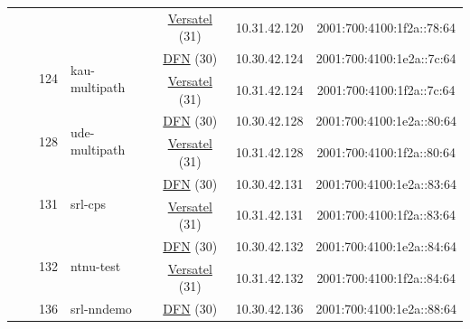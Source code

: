 \begin{small}
\begin{center}
\begin{longtable}{|c|c|c|c|c|c|c|c|}
  &  &  &  & \multicolumn{2}{|c|}{\tiny{\href{http://www.versatel.de}{Versatel} (31)}} & \tiny{10.31.42.120} & \tiny{2001:700:4100:1f2a::78:64} \\* \cline{3-3}\cline{4-4}\cline{5-5}\cline{6-6}\cline{7-7}\cline{8-8}
  &  & \multirow{2}{*}{\tiny{124}} & \multicolumn{1}{|l|}{\multirow{2}{*}{\tiny{kau-multipath}}} & \multicolumn{2}{|c|}{\tiny{\href{https://www.dfn.de}{DFN} (30)}} & \tiny{10.30.42.124} & \tiny{2001:700:4100:1e2a::7c:64} \\* \cline{5-5}\cline{6-6}\cline{7-7}\cline{8-8}
  &  &  &  & \multicolumn{2}{|c|}{\tiny{\href{http://www.versatel.de}{Versatel} (31)}} & \tiny{10.31.42.124} & \tiny{2001:700:4100:1f2a::7c:64} \\* \cline{3-3}\cline{4-4}\cline{5-5}\cline{6-6}\cline{7-7}\cline{8-8}
  &  & \multirow{2}{*}{\tiny{128}} & \multicolumn{1}{|l|}{\multirow{2}{*}{\tiny{ude-multipath}}} & \multicolumn{2}{|c|}{\tiny{\href{https://www.dfn.de}{DFN} (30)}} & \tiny{10.30.42.128} & \tiny{2001:700:4100:1e2a::80:64} \\* \cline{5-5}\cline{6-6}\cline{7-7}\cline{8-8}
  &  &  &  & \multicolumn{2}{|c|}{\tiny{\href{http://www.versatel.de}{Versatel} (31)}} & \tiny{10.31.42.128} & \tiny{2001:700:4100:1f2a::80:64} \\* \cline{3-3}\cline{4-4}\cline{5-5}\cline{6-6}\cline{7-7}\cline{8-8}
  &  & \multirow{2}{*}{\tiny{131}} & \multicolumn{1}{|l|}{\multirow{2}{*}{\tiny{srl-cps}}} & \multicolumn{2}{|c|}{\tiny{\href{https://www.dfn.de}{DFN} (30)}} & \tiny{10.30.42.131} & \tiny{2001:700:4100:1e2a::83:64} \\* \cline{5-5}\cline{6-6}\cline{7-7}\cline{8-8}
  &  &  &  & \multicolumn{2}{|c|}{\tiny{\href{http://www.versatel.de}{Versatel} (31)}} & \tiny{10.31.42.131} & \tiny{2001:700:4100:1f2a::83:64} \\* \cline{3-3}\cline{4-4}\cline{5-5}\cline{6-6}\cline{7-7}\cline{8-8}
  &  & \multirow{2}{*}{\tiny{132}} & \multicolumn{1}{|l|}{\multirow{2}{*}{\tiny{ntnu-test}}} & \multicolumn{2}{|c|}{\tiny{\href{https://www.dfn.de}{DFN} (30)}} & \tiny{10.30.42.132} & \tiny{2001:700:4100:1e2a::84:64} \\* \cline{5-5}\cline{6-6}\cline{7-7}\cline{8-8}
  &  &  &  & \multicolumn{2}{|c|}{\tiny{\href{http://www.versatel.de}{Versatel} (31)}} & \tiny{10.31.42.132} & \tiny{2001:700:4100:1f2a::84:64} \\* \cline{3-3}\cline{4-4}\cline{5-5}\cline{6-6}\cline{7-7}\cline{8-8}
  &  & \multirow{2}{*}{\tiny{136}} & \multicolumn{1}{|l|}{\multirow{2}{*}{\tiny{srl-nndemo}}} & \multicolumn{2}{|c|}{\tiny{\href{https://www.dfn.de}{DFN} (30)}} & \tiny{10.30.42.136} & \tiny{2001:700:4100:1e2a::88:64} \\* \cline{5-5}\cline{6-6}\cline{7-7}\cline{8-8}

\end{longtable}
\end{center}
\end{small}
